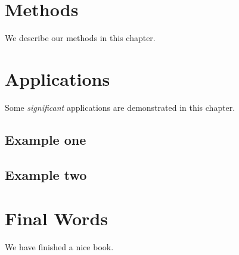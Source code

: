 \documentclass[]{book}
\begin{document}
\chapter{Methods}\label{methods}

We describe our methods in this chapter.

\chapter{Applications}\label{applications}

Some \emph{significant} applications are demonstrated in this chapter.

\section{Example one}\label{example-one}

\section{Example two}\label{example-two}

\chapter{Final Words}\label{final-words}

We have finished a nice book.


\end{document}
